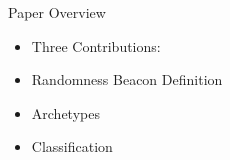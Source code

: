 \begin{frame}{Paper Overview}
    \begin{itemize}
        \item Three Contributions:
        \item Randomness Beacon Definition
        \item Archetypes
        \item Classification
    \end{itemize}        
\end{frame}
